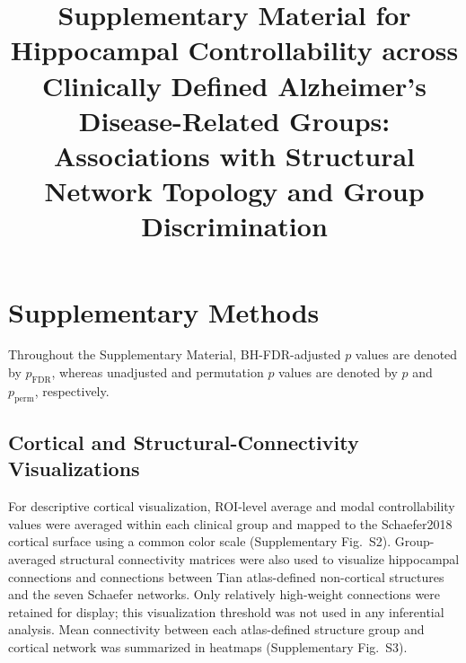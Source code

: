 \documentclass{article}
\title{Supplementary Material for Hippocampal Controllability across Clinically Defined Alzheimer's Disease-Related Groups: Associations with Structural Network Topology and Group Discrimination}
\author{}
\date{}
\begin{document}
\maketitle

\section{Supplementary Methods}

Throughout the Supplementary Material, BH-FDR-adjusted \(p\) values are denoted by \(p_{\mathrm{FDR}}\), whereas unadjusted and permutation \(p\) values are denoted by \(p\) and \(p_{\mathrm{perm}}\), respectively.

\subsection{Cortical and Structural-Connectivity Visualizations}
For descriptive cortical visualization, ROI-level average and modal controllability values were averaged within each clinical group and mapped to the Schaefer2018 cortical surface using a common color scale (Supplementary Fig.~S2). Group-averaged structural connectivity matrices were also used to visualize hippocampal connections and connections between Tian atlas-defined non-cortical structures and the seven Schaefer networks. Only relatively high-weight connections were retained for display; this visualization threshold was not used in any inferential analysis. Mean connectivity between each atlas-defined structure group and cortical network was summarized in heatmaps (Supplementary Fig.~S3).
\end{document}
